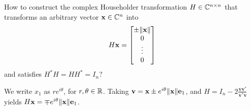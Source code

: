 How to construct the complex Householder transformation \(H \in \mathbb{C}^{n \times n}\) that transforms an arbitrary vector \(\mathbf{x} \in \mathbb{C}^n\) into \[
H\mathbf{x} = \begin{bmatrix}\pm{\left\lVert\mathbf{x}\right\rVert} \\ 0 \\ \vdots \\ 0\end{bmatrix}
\]
and satisfies \(H^*H = HH^* = I_n\)?
\begin{solution}
We write \(x_1\) as \(r e^{i \theta}\), for \(r, \theta \in \mathbb{R}\).
Taking \(\mathbf{v} = \mathbf{x} \pm e^{i \theta} {\left\lVert\mathbf{x}\right\rVert} \mathbf{e}_1\), and \(H = I_n - 2\frac{\mathbf{v}\mathbf{v}^*}{\mathbf{v}^*\mathbf{v}}\) yields \(H\mathbf{x} = \mp e^{i \theta} {\left\lVert\mathbf{x}\right\rVert} \mathbf{e}_1\).
\end{solution}
